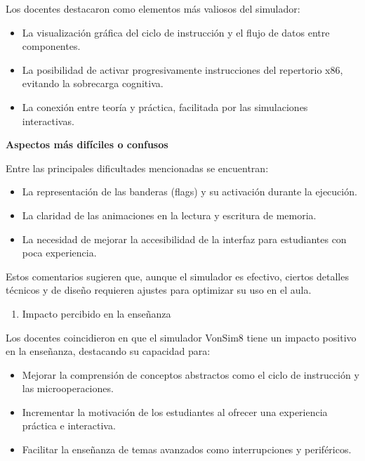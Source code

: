 \documentclass[12pt,oneside]{templates/unerthesis}
\providecommand{\tightlist}{%
  \setlength{\itemsep}{0pt}\setlength{\parskip}{0pt}}
\begin{document}
Los docentes destacaron como elementos más valiosos del simulador:

\begin{itemize}
\tightlist
\item
  La visualización gráfica del ciclo de instrucción y el flujo de datos entre componentes.
\item
  La posibilidad de activar progresivamente instrucciones del repertorio x86, evitando la sobrecarga cognitiva.
\item
  La conexión entre teoría y práctica, facilitada por las simulaciones interactivas.
\end{itemize}

\textbf{Aspectos más difíciles o confusos}

Entre las principales dificultades mencionadas se encuentran:

\begin{itemize}
\tightlist
\item
  La representación de las banderas (flags) y su activación durante la ejecución.
\item
  La claridad de las animaciones en la lectura y escritura de memoria.
\item
  La necesidad de mejorar la accesibilidad de la interfaz para estudiantes con poca experiencia.
\end{itemize}

Estos comentarios sugieren que, aunque el simulador es efectivo, ciertos detalles técnicos y de diseño requieren ajustes para optimizar su uso en el aula.

\begin{enumerate}
\def\labelenumi{\arabic{enumi}.}
\setcounter{enumi}{4}
\tightlist
\item
  Impacto percibido en la enseñanza
\end{enumerate}

Los docentes coincidieron en que el simulador VonSim8 tiene un impacto positivo en la enseñanza, destacando su capacidad para:

\begin{itemize}
\tightlist
\item
  Mejorar la comprensión de conceptos abstractos como el ciclo de instrucción y las microoperaciones.
\item
  Incrementar la motivación de los estudiantes al ofrecer una experiencia práctica e interactiva.
\item
  Facilitar la enseñanza de temas avanzados como interrupciones y periféricos.
\end{itemize}
\end{document}
